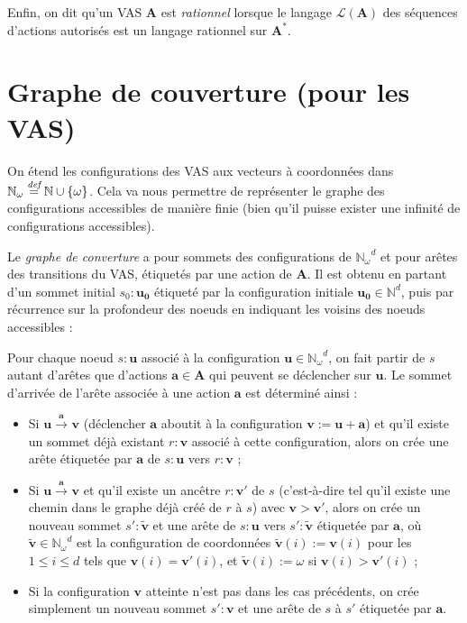 \documentclass[a4paper,final]{article}
\let\leq\leqslant
\newcommand{\os}[1]{\left\{\mathinner{#1}\right\}}
\newcommand{\defeq}{\ensuremath{\stackrel{\textit{def}}{=}}}
\let\union\cup
\newcommand{\N}{\ensuremath{\mathbb{N}}}
\newcommand{\Nomega}{\ensuremath{\mathbb{N}_\omega}}
\newcommand{\lang}{\ensuremath{\mathcal{L}}}
\newcommand{\trans}[2]{\ensuremath{\stackrel{#1}{\longrightarrow}_{#2}}}
\newcommand{\vect}[1]{\ensuremath{\mathbf{#1}}}
\newcommand{\action}[1]{\ensuremath{\mathbf{#1}}}
\newcommand{\ensaction}{\ensuremath{\mathbf{A}}}
\begin{document}
Enfin, on dit qu'un VAS $\ensaction$ est \emph{rationnel} lorsque le langage $\lang(\ensaction)$ des séquences d'actions autorisés est un langage rationnel sur $\ensaction^\ast$.


\section{Graphe de couverture (pour les VAS)}

On étend les configurations des VAS aux vecteurs à coordonnées dans $\Nomega\defeq \N\union\os{\omega}$.
Cela va nous permettre de représenter le graphe des configurations accessibles de manière finie (bien qu'il puisse exister une infinité de configurations accessibles).

Le \emph{graphe de converture} a pour sommets des configurations de $\Nomega^d$ et pour arêtes des transitions du VAS, étiquetés par une action de $\ensaction$.
Il est obtenu en partant d'un sommet initial $s_0:\vect{u_0}$ étiqueté par la configuration initiale $\vect{u_0}\in \N^d$, puis par récurrence sur la profondeur des noeuds en indiquant les voisins des noeuds accessibles :

Pour chaque noeud $s:\vect{u}$ associé à la configuration $\vect{u}\in \Nomega^d$, on fait partir de $s$ autant d'arêtes que d'actions $\action{a}\in \ensaction$ qui peuvent se déclencher sur $\vect{u}$.
Le sommet d'arrivée de l'arête associée à une action $\action{a}$ est déterminé ainsi :
\begin{itemize}
    \item Si $\vect{u}\trans{\action{a}}{} \vect{v}$ (déclencher $\action{a}$ aboutit à la configuration $\vect{v} := \vect{u} + \action{a}$) et qu'il existe un sommet déjà existant $r:\vect{v}$ associé à cette configuration, alors on crée une arête étiquetée par $\action{a}$ de $s:\vect{u}$ vers $r:\vect{v}$ ;
    \item Si $\vect{u}\trans{\action{a}}{} \vect{v}$ et qu'il existe un ancêtre $r:\vect{v'}$ de $s$  (c'est-à-dire tel qu'il existe une chemin dans le graphe déjà créé de $r$ à $s$) avec $\vect{v}>\vect{v'}$, alors on crée un nouveau sommet $s':\vect{\tilde{v}}$ et une arête de $s:\vect{u}$ vers $s':\vect{\tilde{v}}$ étiquetée par $\action{a}$, 
    où $\vect{\tilde{v}}\in \Nomega^d$ est la configuration de coordonnées $\vect{\tilde{v}}(i):=\vect{v}(i)$ pour les $1\leq i\leq d$ tels que $\vect{v}(i)=\vect{v'}(i)$, et $\vect{\tilde{v}}(i):=\omega$ si $\vect{v}(i)>\vect{v'}(i)$ ;
    \item Si la configuration $\vect{v}$ atteinte n'est pas dans les cas précédents, on crée simplement un nouveau sommet $s':\vect{v}$ et une arête de $s$ à $s'$ étiquetée par $\action{a}$.
\end{itemize}
\end{document}
